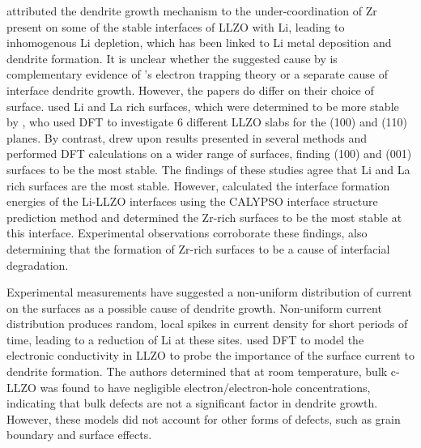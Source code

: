 \documentclass[../main.tex]{subfiles}
\begin{document}
\citeauthor{Gao2020} attributed the dendrite growth mechanism to the under-coordination of Zr present on some of the stable interfaces of LLZO with Li,\cite{Gao2020} leading to inhomogenous Li depletion, which has been linked to Li metal deposition and dendrite formation.\cite{Shen2018, Aguesse2017, Krauskopf2019, Zhu2019, Tsai2016} It is unclear whether the suggested cause by \citeauthor{Gao2020} is complementary evidence of \citeauthor{Tian2018}'s electron trapping theory or a separate cause of interface dendrite growth. However, the papers do differ on their choice of surface. \citeauthor{Tian2018} used Li and La rich surfaces, which were determined to be more stable by \citeauthor{Thompson2017}, who used DFT to investigate 6 different LLZO slabs for the (100) and (110) planes.\cite{Thompson2017} By contrast, \citeauthor{Gao2020} drew upon results presented in several methods\cite{Thompson2017, Canepa2018, Yu2016a} and performed DFT calculations on a wider range of surfaces, finding (100) and (001) surfaces to be the most stable. The findings of these studies agree that Li and La rich surfaces are the most stable. However, \citeauthor{Gao2020} calculated the interface formation energies of the Li-LLZO interfaces using the CALYPSO interface structure prediction method\cite{Wang2012} and determined the Zr-rich surfaces to be the most stable at this interface.\cite{Gao2019} Experimental observations corroborate these findings, also determining that the formation of Zr-rich surfaces to be a cause of interfacial degradation.\cite{Zhu2019}

Experimental measurements have suggested a non-uniform distribution of current on the surfaces as a possible cause of dendrite growth.\cite{Han2019_dendrite, Aguesse2017} Non-uniform current distribution produces random, local spikes in current density for short periods of time, leading to a reduction of Li at these sites. \citeauthor{squires_2020} used DFT to model the electronic conductivity in LLZO to probe the importance of the surface current to dendrite formation.\cite{squires_2020} The authors determined that at room temperature, bulk c-LLZO was found to have negligible electron/electron-hole concentrations, indicating that bulk defects are not a significant factor in dendrite growth. However, these models did not account for other forms of defects, such as grain boundary and surface effects.
\end{document}
